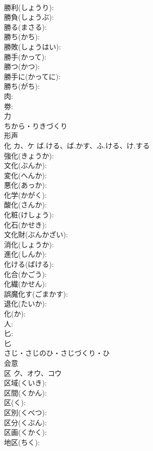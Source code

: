 \documentclass[8pt]{extreport}
\begin{document}
\begin{CJK}{UTF8}{min}
\\	勝利(しょうり): 
\\	勝負(しょうぶ): 
\\	勝る(まさる): 
\\	勝ち(かち): 
\\	勝敗(しょうはい): 
\\	勝手(かって): 
\\	勝つ(かつ): 
\\	勝手に(かってに): 
\\	勝ち(がち): 
\\	肉: 
\\	劵: 
\\	力	
\\	ちから・りきづくり	
\\	形声 
\\	化	カ、ケ	ば.ける、ば.かす、ふ.ける、け.する		
\\	強化(きょうか): 
\\	文化(ぶんか): 
\\	変化(へんか): 
\\	悪化(あっか): 
\\	化学(かがく): 
\\	酸化(さんか): 
\\	化粧(けしょう): 
\\	化石(かせき): 
\\	文化財(ぶんかざい): 
\\	消化(しょうか): 
\\	進化(しんか): 
\\	化ける(ばける): 
\\	化合(かごう): 
\\	化繊(かせん): 
\\	誤魔化す(ごまかす): 
\\	退化(たいか): 
\\	化(か): 
\\	人: 
\\	匕: 
\\	匕	
\\	さじ・さじのひ・さじづくり・ひ	
\\	会意 
\\	区	ク、オウ、コウ			
\\	区域(くいき): 
\\	区間(くかん): 
\\	区(く): 
\\	区別(くべつ): 
\\	区分(くぶん): 
\\	区画(くかく): 
\\	地区(ちく): 

\end{CJK}
\end{document}
